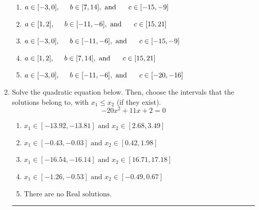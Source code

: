\documentclass[14pt]{extbook}
\newcommand{\litem}[1]{\item#1\hspace*{-1cm}\rule{\textwidth}{0.4pt}}
\begin{document}
\begin{enumerate}
{\begin{center}
\end{center}
\begin{enumerate}[label=\Alph*.]
\item \( a \in [-3, 0], \hspace*{5mm} b \in [7, 14], \text{ and } \hspace*{5mm} c \in [-15, -9] \)
\item \( a \in [1, 2], \hspace*{5mm} b \in [-11, -6], \text{ and } \hspace*{5mm} c \in [15, 21] \)
\item \( a \in [-3, 0], \hspace*{5mm} b \in [-11, -6], \text{ and } \hspace*{5mm} c \in [-15, -9] \)
\item \( a \in [1, 2], \hspace*{5mm} b \in [7, 14], \text{ and } \hspace*{5mm} c \in [15, 21] \)
\item \( a \in [-3, 0], \hspace*{5mm} b \in [-11, -6], \text{ and } \hspace*{5mm} c \in [-20, -16] \)

\end{enumerate} }
\litem{
Solve the quadratic equation below. Then, choose the intervals that the solutions belong to, with $x_1 \leq x_2$ (if they exist).\[ -20x^{2} +11 x + 2 = 0 \]\begin{enumerate}[label=\Alph*.]
\item \( x_1 \in [-13.92, -13.81] \text{ and } x_2 \in [2.68, 3.49] \)
\item \( x_1 \in [-0.43, -0.03] \text{ and } x_2 \in [0.42, 1.98] \)
\item \( x_1 \in [-16.54, -16.14] \text{ and } x_2 \in [16.71, 17.18] \)
\item \( x_1 \in [-1.26, -0.53] \text{ and } x_2 \in [-0.49, 0.67] \)
\item \( \text{There are no Real solutions.} \)


\end{enumerate}}
\end{enumerate}
\end{document}
